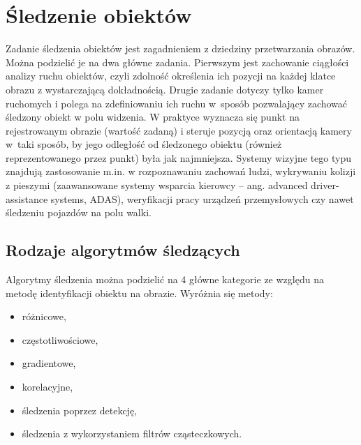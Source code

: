 
\chapter{Śledzenie obiektów}
\label{cha:sledzenieObiektow}

Zadanie śledzenia obiektów jest zagadnieniem z dziedziny przetwarzania obrazów. Można podzielić je na dwa główne zadania. Pierwszym jest zachowanie ciągłości analizy ruchu obiektów, czyli zdolność określenia ich pozycji na każdej klatce obrazu z wystarczającą dokładnością. Drugie zadanie dotyczy tylko kamer ruchomych i polega na zdefiniowaniu ich ruchu w~sposób pozwalający zachować śledzony obiekt w polu widzenia. %
W praktyce wyznacza się punkt na rejestrowanym obrazie (wartość zadaną) i steruje pozycją oraz orientacją kamery w~taki sposób, by jego odległość od śledzonego obiektu (również reprezentowanego przez punkt) była jak najmniejsza. 
Systemy wizyjne tego typu znajdują zastosowanie m.in. w rozpoznawaniu zachowań ludzi, wykrywaniu kolizji z pieszymi (zaawansowane systemy wsparcia kierowcy -- ang. advanced driver-assistance systems, ADAS), weryfikacji pracy urządzeń przemysłowych czy nawet śledzeniu pojazdów na polu walki.


\section{Rodzaje algorytmów śledzących}
\label{sec:algorytmySledzace}

Algorytmy śledzenia można podzielić na 4 główne kategorie ze względu na metodę identyfikacji obiektu na obrazie. 
Wyróżnia się metody:
\begin{itemize}
	\item różnicowe,
	\item częstotliwościowe,
	\item gradientowe,
	\item korelacyjne,
	\item śledzenia poprzez detekcję,
	\item śledzenia z wykorzystaniem filtrów cząsteczkowych.
\end{itemize}

